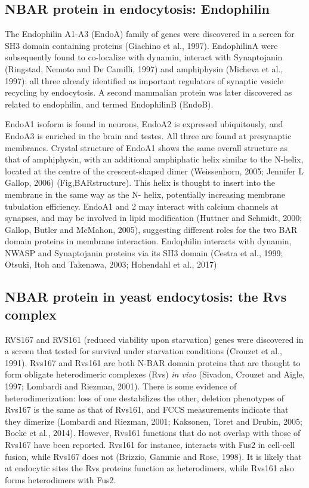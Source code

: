 	\subsection{NBAR protein in endocytosis: Endophilin }	
The Endophilin A1-A3 (EndoA) family of genes were discovered in a screen for SH3 domain containing proteins (Giachino et al., 1997). EndophilinA were subsequently found to co-localize with dynamin, interact with Synaptojanin (Ringstad, Nemoto and De Camilli, 1997) and amphiphysin (Micheva et al., 1997): all three already identified as important regulators of synaptic vesicle recycling by endocytosis. A second mammalian protein was later discovered as related to endophilin, and termed EndophilinB (EndoB). 

	\vspace{5mm}
EndoA1 isoform is found in neurons, EndoA2 is expressed ubiquitously, and EndoA3 is enriched in the brain and testes. All three are found at presynaptic membranes. Crystal structure of EndoA1 shows the same overall structure as that of amphiphysin, with an additional amphiphatic helix similar to the N-helix, located at the centre of the crescent-shaped dimer (Weissenhorn, 2005; Jennifer L Gallop, 2006) (Fig,BARstructure). This helix is thought to insert into the membrane in the same way as the N- helix, potentially increasing membrane tubulation efficiency. EndoA1 and 2 may interact with calcium channels at synapses, and may be involved in lipid modification (Huttner and Schmidt, 2000; Gallop, Butler and McMahon, 2005), suggesting different roles for the two BAR domain proteins in membrane interaction. Endophilin interacts with dynamin, NWASP and Synaptojanin proteins via its SH3 domain (Cestra et al., 1999; Otsuki, Itoh and Takenawa, 2003; Hohendahl et al., 2017)





	\subsection{NBAR protein in yeast endocytosis: the Rvs complex}		
RVS167 and RVS161 (reduced viability upon starvation) genes were discovered in a screen that tested for survival under starvation conditions (Crouzet et al., 1991). Rvs167 and Rvs161 are both N-BAR domain proteins that are thought to form obligate heterodimeric complexes (Rvs) \textit{in vivo} (Sivadon, Crouzet and Aigle, 1997; Lombardi and Riezman, 2001). There is some evidence of heterodimerization: loss of one destabilizes the other, deletion phenotypes of Rvs167 is the same as that of Rvs161, and FCCS measurements indicate that they dimerize (Lombardi and Riezman, 2001; Kaksonen, Toret and Drubin, 2005; Boeke et al., 2014). However, Rvs161 functions that do not overlap with those of Rvs167 have been reported. Rvs161 for instance, interacts with Fus2 in cell-cell fusion, while Rvs167 does not (Brizzio, Gammie and Rose, 1998). It is likely that at endocytic sites the Rvs proteins function as heterodimers, while Rvs161 also forms heterodimers with Fus2. 

